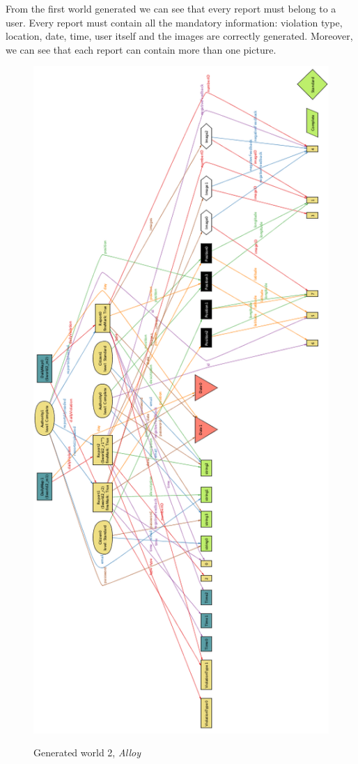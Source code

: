 \documentclass[../RASD.tex]{subfiles}
\begin{document}
    From the first world generated we can see that every report must belong to a user.
    Every report must contain all the mandatory information: violation type, location, date, time, user itself and the images are correctly generated.
    Moreover, we can see that each report can contain more than one picture.

    \begin{figure}[H]
        \centering
        \includegraphics[scale = 0.6]{assets/world2.png}\\
        \caption[Generated world 2, \textit{Alloy}]{Generated world 2, \textit{Alloy}}
    \end{figure}
\end{document}
